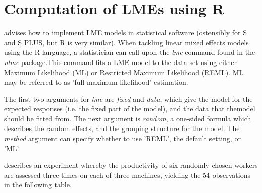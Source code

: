 \documentclass[12pt, a4paper]{report}
\theoremstyle{plain}
\theoremstyle{definition}
\theoremstyle{remark}
\begin{document}


\newpage

\section{Computation of LMEs using R} \cite{PB} advises how to
implement LME models in statistical software (ostensibly for S and
S PLUS, but R is very similar). When tackling linear mixed effects
models using the R language, a statistician can call upon the
\emph{lme} command found in the \emph{nlme} package.This command
fits a LME model to the data set using either Maximum Likelihood
(ML) or Restricted Maximum Likelihood (REML). ML may be referred
to as 'full maximum likelihood' estimation.

The first two arguments for \emph{lme} are \emph{fixed} and
\emph{data}, which give the model for the expected responses (i.e.
the fixed part of the model), and the data that themodel should be
fitted from. The next argument is  \emph{random}, a one-sided
formula which describes the random effects, and the grouping
structure for the model. The  \emph{method} argument can specify
whether to use 'REML', the default setting, or 'ML'.

\citet{PB} describes an experiment whereby the productivity of six
randomly chosen workers are assessed three times on each of three
machines, yielding the 54 observations in the following table.
\end{document}
